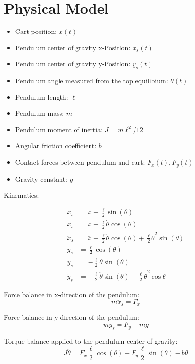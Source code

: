 \documentclass{article}
\begin{document}
	

\section{Physical Model}

\begin{itemize}
	\item Cart position: $x(t)$
	\item Pendulum center of gravity x-Position: $x_s(t)$
	\item Pendulum center of gravity y-Position: $y_s(t)$
	\item Pendulum angle measured from the top equilibium: $\theta(t)$
	\item Pendulum length: $\ell$
	\item Pendulum mass: $m$
	\item Pendulum moment of inertia: $J = m\ell^2 / 12$
	\item Angular friction coefficient: $b$
	\item Contact forces between pendulum and cart: $F_x(t), F_y(t)$
	\item Gravity constant: $g$
\end{itemize}

Kinematics:

\begin{align*}
x_s &= x - \frac{\ell}{2} \sin(\theta)\\
\dot{x}_s &= \dot{x} - \frac{\ell}{2}\dot{\theta}\cos(\theta)\\
\ddot{x}_s &= \ddot{x} - \frac{\ell}{2}\ddot{\theta}\cos(\theta) + \frac{\ell}{2}\dot{\theta}^2\sin(\theta)\\
y_s &= \frac{\ell}{2}\cos(\theta)\\
\dot{y}_s &= -\frac{\ell}{2}\dot{\theta}\sin(\theta)\\
\ddot{y}_s &= -\frac{\ell}{2}\ddot{\theta}\sin(\theta)- \frac{\ell}{2}\dot{\theta}^2\cos{\theta}
\end{align*}

Force balance in x-direction of the pendulum:
\begin{equation}\label{eq:xbalance}
m \ddot{x}_s = F_x
\end{equation}

Force balance in y-direction of the pendulum:
\begin{equation}\label{eq:ybalance}
m \ddot{y}_s = F_y - mg
\end{equation}

Torque balance applied to the pendulum center of gravity:
\begin{equation}\label{eq:torquebalance}
J\ddot{\theta} = F_x \frac{\ell}{2}\cos(\theta) + F_y \frac{\ell}{2}\sin(\theta) - b\dot{\theta}
\end{equation}
\end{document}
